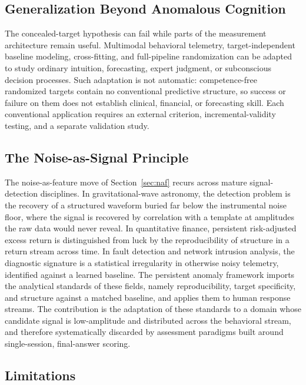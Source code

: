 \documentclass[11pt,letterpaper]{article}
\begin{document}
\subsection{Generalization Beyond Anomalous Cognition}
\label{sec:generalization}
The concealed-target hypothesis can fail while parts of the measurement architecture remain useful. Multimodal behavioral telemetry, target-independent baseline modeling, cross-fitting, and full-pipeline randomization can be adapted to study ordinary intuition, forecasting, expert judgment, or subconscious decision processes. Such adaptation is not automatic: competence-free randomized targets contain no conventional predictive structure, so success or failure on them does not establish clinical, financial, or forecasting skill. Each conventional application requires an external criterion, incremental-validity testing, and a separate validation study.

\subsection{The Noise-as-Signal Principle}

The noise-as-feature move of Section~\ref{sec:naf} recurs across mature signal-detection disciplines. In gravitational-wave astronomy, the detection problem is the recovery of a structured waveform buried far below the instrumental noise floor, where the signal is recovered by correlation with a template at amplitudes the raw data would never reveal. In quantitative finance, persistent risk-adjusted excess return is distinguished from luck by the reproducibility of structure in a return stream across time. In fault detection and network intrusion analysis, the diagnostic signature is a statistical irregularity in otherwise noisy telemetry, identified against a learned baseline. The persistent anomaly framework imports the analytical standards of these fields, namely reproducibility, target specificity, and structure against a matched baseline, and applies them to human response streams. The contribution is the adaptation of these standards to a domain whose candidate signal is low-amplitude and distributed across the behavioral stream, and therefore systematically discarded by assessment paradigms built around single-session, final-answer scoring.

\subsection{Limitations}
\end{document}
